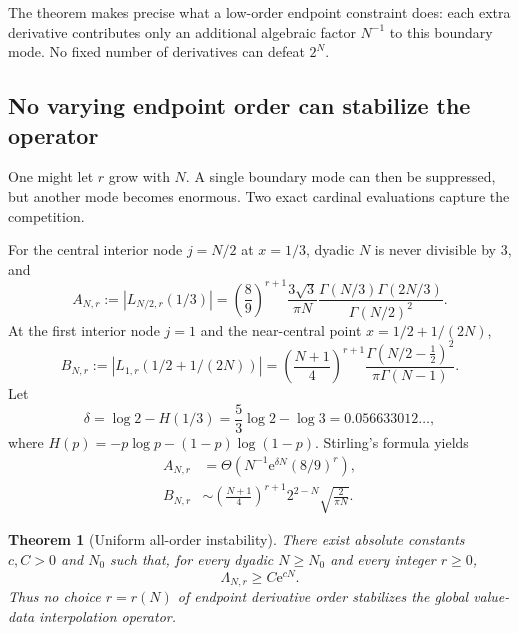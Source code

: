 \documentclass[11pt,oneside]{article}
\newtheorem{theorem}{Theorem}[section]
\theoremstyle{definition}
\theoremstyle{remark}
\newcommand{\e}{\mathrm e}
\begin{document}
The theorem makes precise what a low-order endpoint constraint does: each extra derivative
contributes only an additional algebraic factor $N^{-1}$ to this boundary mode.  No fixed
number of derivatives can defeat $2^N$.

\subsection{No varying endpoint order can stabilize the operator}

One might let $r$ grow with $N$.  A single boundary mode can then be suppressed, but another
mode becomes enormous.  Two exact cardinal evaluations capture the competition.

For the central interior node $j=N/2$ at $x=1/3$, dyadic $N$ is never divisible by $3$, and
\begin{equation}
 A_{N,r}:=|L_{N/2,r}(1/3)|
 =\left(\frac89\right)^{r+1}
 \frac{3\sqrt3}{\pi N}
 \frac{\Gamma(N/3)\Gamma(2N/3)}{\Gamma(N/2)^2}.
 \label{eq:mode-A}
\end{equation}
At the first interior node $j=1$ and the near-central point
$x=1/2+1/(2N)$,
\begin{equation}
 B_{N,r}:=|L_{1,r}(1/2+1/(2N))|
 =\left(\frac{N+1}{4}\right)^{r+1}
 \frac{\Gamma(N/2-\tfrac12)^2}{\pi\Gamma(N-1)}.
 \label{eq:mode-B}
\end{equation}
Let
\begin{equation}
 \delta=\log2-H(1/3)
 =\frac53\log2-\log3
 =0.056633012\ldots,
 \label{eq:delta}
\end{equation}
where $H(p)=-p\log p-(1-p)\log(1-p)$.
Stirling's formula yields
\begin{align}
 A_{N,r}&=\Theta\!\left(N^{-1}\e^{\delta N}(8/9)^r\right),
 \label{eq:A-asympt}\\
 B_{N,r}&\sim
 \left(\frac{N+1}{4}\right)^{r+1}
 2^{2-N}\sqrt{\frac{2}{\pi N}}.
 \label{eq:B-asympt}
\end{align}

\begin{theorem}[Uniform all-order instability]
\label{thm:all-r}
There exist absolute constants $c,C>0$ and $N_0$ such that, for every dyadic
$N\ge N_0$ and every integer $r\ge0$,
\begin{equation}
 \boxed{\Lambda_{N,r}\ge C\e^{cN}.}
 \label{eq:uniform-instability}
\end{equation}
Thus no choice $r=r(N)$ of endpoint derivative order stabilizes the global value-data
interpolation operator.
\end{theorem}
\end{document}
